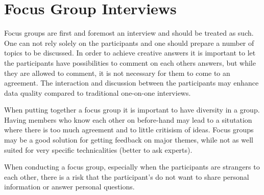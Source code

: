 \section{Focus Group Interviews}

Focus groups are first and foremost an interview and should be treated as such. One can not rely solely on the participants and one should prepare a number of topics to be discussed. In order to achieve creative answers it is important to let the participants have possibilities to comment on each others answers, but while they are allowed to comment, it is not necessary for them to come to an agreement. The interaction and discussion between the participants may enhance data quality compared to traditional one-on-one interviews. 

When putting together a focus group it is important to have diversity in a group. Having members who know each other on before-hand may lead to a situtation where there is too much agreement and to little critisism of ideas. Focus groups may be a good solution for getting feedback on major themes, while not as well suited for very specific technicalities (better to ask experts). 

When conducting a focus group, especially when the participants are strangers to each other, there is a risk that the participant's do not want to share personal information or answer personal questions.